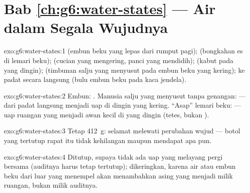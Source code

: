 \section*{Bab \ref{ch:g6:water-states} --- Air dalam Segala Wujudnya}

\begin{solution}{exo:g6:water-states:1}
 (embun beku yang lepas dari rumput pagi); 
(bongkahan es di lemari beku);  (cucian yang mengering, panci
yang mendidih);  (kabut pada  yang dingin); 
(timbunan salju yang menyusut pada embun beku yang kering);  ke
padat secara langsung (bulu embun beku pada kaca jendela).
\end{solution}

\begin{solution}{exo:g6:water-states:2}
Embun: . Manusia salju yang menyusut tanpa genangan:
 --- dari padat langsung menjadi uap di  dingin yang
kering. ``Asap'' lemari beku:  --- uap ruangan yang
 menjadi awan kecil di  yang dingin (tetes, bukan ).
\end{solution}

\begin{solution}{exo:g6:water-states:3}
Tetap \qty{412}{g}:  selamat melewati perubahan wujud --- botol
yang tertutup rapat itu tidak kehilangan maupun mendapat apa pun.
\end{solution}

\begin{solution}{exo:g6:water-states:4}
Ditutup, supaya tidak ada uap yang melayang pergi bersama 
(auditnya harus tetap tertutup); dikeringkan, karena air atau embun
beku dari luar yang menempel akan menambahkan  asing yang menjadi
milik ruangan, bukan milik auditnya.
\end{solution}

